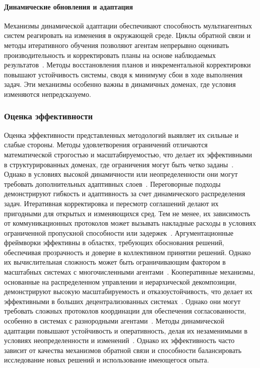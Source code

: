 \paragraph{Динамические обновления и адаптация}

Механизмы динамической адаптации обеспечивают способность мультиагентных систем реагировать на изменения в окружающей среде.
Циклы обратной связи и методы итеративного обучения позволяют агентам непрерывно оценивать производительность
и корректировать планы на основе наблюдаемых результатов~\cite{LU2014215}.
Методы восстановления планов и инкрементальной корректировки повышают устойчивость системы,
сводя к минимуму сбои в ходе выполнения задач.
Эти механизмы особенно важны в динамичных доменах, где условия изменяются непредсказуемо.

\subsubsection{Оценка эффективности}

Оценка эффективности представленных методологий выявляет их сильные и слабые стороны.
Методы удовлетворения ограничений отличаются математической строгостью и масштабируемостью,
что делает их эффективными в структурированных доменах,
где ограничения могут быть четко заданы~\cite{STOLBA2017175}.
Однако в условиях высокой динамичности или неопределенности они могут требовать дополнительных адаптивных слоев~\cite{SHARON201540}.
Переговорные подходы демонстрируют гибкость и адаптивность за счет динамического распределения задач.
Итеративная корректировка и пересмотр соглашений делают их пригодными для открытых и изменяющихся сред.
Тем не менее, их зависимость от коммуникационных протоколов может вызывать накладные расходы в условиях ограниченной пропускной способности или задержек~\cite{PAJARESFERRANDO201322}.
Аргументационные фреймворки эффективны в областях, требующих обоснования решений,
обеспечивая прозрачность и доверие в коллективном принятии решений.
Однако их вычислительная сложность может быть ограничивающим фактором в масштабных системах с многочисленными агентами~\cite{FERRANDO20171}.
Кооперативные механизмы, основанные на распределенном управлении и иерархической декомпозиции,
демонстрируют высокую масштабируемость и отказоустойчивость,
что делает их эффективными в больших децентрализованных системах~\cite{MA2021103823}.
Однако они могут требовать сложных протоколов координации для обеспечения согласованности, особенно в системах с разнородными агентами~\cite{JUNG1999149}.
Методы динамической адаптации повышают устойчивость и оперативность,
делая их незаменимыми в условиях неопределенности и изменений~\cite{LU2014215}.
Однако их эффективность часто зависит от качества механизмов обратной связи
и способности балансировать исследование новых решений и использование имеющегося опыта.

